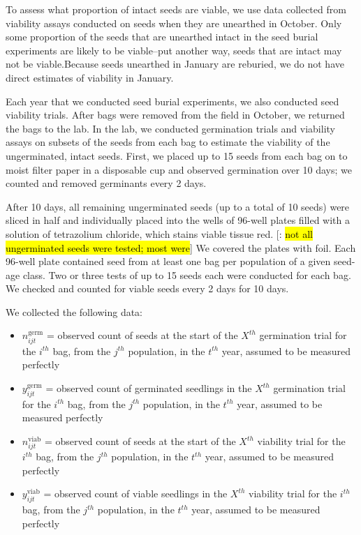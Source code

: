 \documentclass[12pt, oneside, titlepage]{article}   	%
\begin{document}
To assess what proportion of intact seeds are viable, we use data collected from viability assays conducted on seeds when they are unearthed in October.  Only some proportion of the seeds that are unearthed intact in the seed burial experiments are likely to be viable--put another way, seeds that are intact may not be viable.Because seeds unearthed in January are reburied, we do not have direct estimates of viability in January.

Each year that we conducted seed burial experiments, we also conducted seed viability trials. After bags were removed from the field in October, we returned the bags to the lab. In the lab, we conducted germination trials and viability assays on subsets of the seeds from each bag to estimate the viability of the ungerminated, intact seeds. First, we placed up to 15 seeds from each bag on to moist filter paper in a disposable cup and observed germination over 10 days; we counted and removed germinants every 2 days. 

After 10 days, all remaining ungerminated seeds (up to a total of 10 seeds) were sliced in half and individually placed into the wells of 96-well plates filled with a solution of tetrazolium chloride, which stains viable tissue red. [\cite{eckhart2011}: \hl{not all ungerminated seeds were tested; most were}] We covered the plates with foil. Each 96-well plate contained seed from at least one bag per population of a given seed-age class. Two or three tests of up to 15 seeds each were conducted for each bag. We checked and counted for viable seeds every 2 days for 10 days. 

We collected the following data: 

\begin{itemize}
	\item $n^{\mathrm{germ}}_{ijt}$ = observed count of seeds at the start of the $X^{th}$ germination trial for the $i^{th}$ bag, from the $j^{th}$ population, in the $t^{th}$ year, assumed to be measured perfectly
	\item $y^{\mathrm{germ}}_{ijt}$ = observed count of germinated seedlings in the $X^{th}$ germination trial for the $i^{th}$ bag, from the $j^{th}$ population, in the $t^{th}$ year, assumed to be measured perfectly 
	\item $n^{\mathrm{viab}}_{ijt}$ = observed count of seeds at the start of the $X^{th}$ viability trial for the $i^{th}$ bag, from the $j^{th}$ population, in the $t^{th}$ year, assumed to be measured perfectly 
	\item $y^{\mathrm{viab}}_{ijt}$ = observed count of viable seedlings in the $X^{th}$ viability trial for the $i^{th}$ bag, from the $j^{th}$ population, in the $t^{th}$ year, assumed to be measured perfectly 
\end{itemize}
\end{document}
